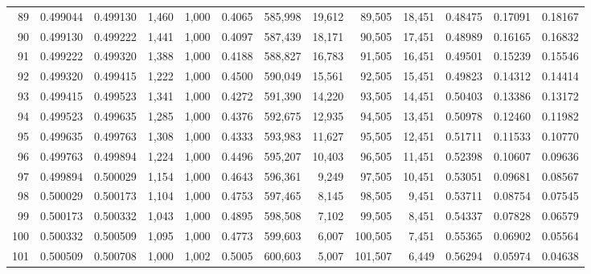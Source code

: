 \begin{tabular}{rrrrrrrrrrrrr}
89  &  0.499044 &  0.499130 &   1,460 &  1,000 &                                     0.4065 &  585,998 &   19,612 &   89,505 &   18,451 &  0.48475 &  0.17091 &  0.18167 \\
90  &  0.499130 &  0.499222 &   1,441 &  1,000 &                                     0.4097 &  587,439 &   18,171 &   90,505 &   17,451 &  0.48989 &  0.16165 &  0.16832 \\
91  &  0.499222 &  0.499320 &   1,388 &  1,000 &                                     0.4188 &  588,827 &   16,783 &   91,505 &   16,451 &  0.49501 &  0.15239 &  0.15546 \\
92  &  0.499320 &  0.499415 &   1,222 &  1,000 &                                     0.4500 &  590,049 &   15,561 &   92,505 &   15,451 &  0.49823 &  0.14312 &  0.14414 \\
93  &  0.499415 &  0.499523 &   1,341 &  1,000 &                                     0.4272 &  591,390 &   14,220 &   93,505 &   14,451 &  0.50403 &  0.13386 &  0.13172 \\
94  &  0.499523 &  0.499635 &   1,285 &  1,000 &                                     0.4376 &  592,675 &   12,935 &   94,505 &   13,451 &  0.50978 &  0.12460 &  0.11982 \\
95  &  0.499635 &  0.499763 &   1,308 &  1,000 &                                     0.4333 &  593,983 &   11,627 &   95,505 &   12,451 &  0.51711 &  0.11533 &  0.10770 \\
96  &  0.499763 &  0.499894 &   1,224 &  1,000 &                                     0.4496 &  595,207 &   10,403 &   96,505 &   11,451 &  0.52398 &  0.10607 &  0.09636 \\
97  &  0.499894 &  0.500029 &   1,154 &  1,000 &                                     0.4643 &  596,361 &    9,249 &   97,505 &   10,451 &  0.53051 &  0.09681 &  0.08567 \\
98  &  0.500029 &  0.500173 &   1,104 &  1,000 &                                     0.4753 &  597,465 &    8,145 &   98,505 &    9,451 &  0.53711 &  0.08754 &  0.07545 \\
99  &  0.500173 &  0.500332 &   1,043 &  1,000 &                                     0.4895 &  598,508 &    7,102 &   99,505 &    8,451 &  0.54337 &  0.07828 &  0.06579 \\
100 &  0.500332 &  0.500509 &   1,095 &  1,000 &                                     0.4773 &  599,603 &    6,007 &  100,505 &    7,451 &  0.55365 &  0.06902 &  0.05564 \\
101 &  0.500509 &  0.500708 &   1,000 &  1,002 &                                     0.5005 &  600,603 &    5,007 &  101,507 &    6,449 &  0.56294 &  0.05974 &  0.04638 \\

\end{tabular}
